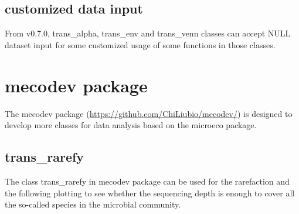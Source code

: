 \documentclass[
]{book}
\newenvironment{Shaded}{\begin{snugshade}}{\end{snugshade}}
\newcommand{\AttributeTok}[1]{\textcolor[rgb]{0.77,0.63,0.00}{#1}}
\newcommand{\ConstantTok}[1]{\textcolor[rgb]{0.00,0.00,0.00}{#1}}
\newcommand{\FunctionTok}[1]{\textcolor[rgb]{0.00,0.00,0.00}{#1}}
\newcommand{\NormalTok}[1]{#1}
\newcommand{\OtherTok}[1]{\textcolor[rgb]{0.56,0.35,0.01}{#1}}
\newcommand{\SpecialCharTok}[1]{\textcolor[rgb]{0.00,0.00,0.00}{#1}}
\begin{document}
\hypertarget{customized-data-input}{%
\section{customized data input}\label{customized-data-input}}

From v0.7.0, trans\_alpha, trans\_env and trans\_venn classes can accept NULL dataset input for some customized usage of some functions in those classes.

\begin{Shaded}
\end{Shaded}

\hypertarget{mecodev-package}{%
\chapter{mecodev package}\label{mecodev-package}}

The mecodev package (\url{https://github.com/ChiLiubio/mecodev/}) is designed to develop more classes for data analysis based on the microeco package.

\hypertarget{trans_rarefy}{%
\section{trans\_rarefy}\label{trans_rarefy}}

The class trans\_rarefy in mecodev package can be used for the rarefaction and the following plotting to see whether
the sequencing depth is enough to cover all the so-called species in the microbial community.
\end{document}
